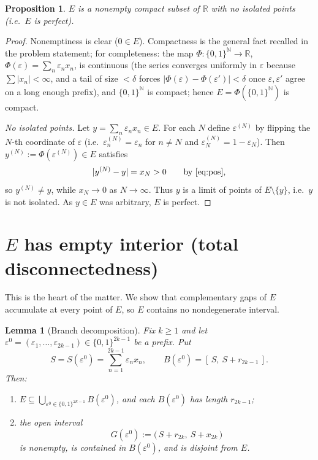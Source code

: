 \documentclass{amsart}
\newtheorem{lemma}{Lemma}
\newtheorem{proposition}{Proposition}
\theoremstyle{definition}
\begin{document}
\begin{proposition}\label{prop:perfect}
$E$ is a nonempty compact subset of $\mathbb R$ with no isolated points (i.e.\ $E$ is perfect).
\end{proposition}

\begin{proof}
Nonemptiness is clear ($0\in E$). Compactness is the general fact recalled in the
problem statement; for completeness: the map
$\Phi\colon\{0,1\}^{\mathbb N}\to\mathbb R$, $\Phi(\varepsilon)=\sum_{n}\varepsilon_n x_n$, is continuous
(the series converges uniformly in $\varepsilon$ because $\sum|x_n|<\infty$, and a tail of size
$<\delta$ forces $|\Phi(\varepsilon)-\Phi(\varepsilon')|<\delta$ once $\varepsilon,\varepsilon'$ agree on a long enough
prefix), and $\{0,1\}^{\mathbb N}$ is compact; hence $E=\Phi(\{0,1\}^{\mathbb N})$ is compact.

\emph{No isolated points.} Let $y=\sum_{n}\varepsilon_n x_n\in E$. For each $N$ define
$\varepsilon^{(N)}$ by flipping the $N$-th coordinate of $\varepsilon$ (i.e.\ $\varepsilon^{(N)}_n=\varepsilon_n$ for
$n\ne N$ and $\varepsilon^{(N)}_N=1-\varepsilon_N$). Then $y^{(N)}:=\Phi(\varepsilon^{(N)})\in E$ satisfies
$$|y^{(N)}-y|=x_N>0\qquad\text{by \eqref{eq:pos},}$$
so $y^{(N)}\ne y$, while $x_N\to 0$ as $N\to\infty$. Thus $y$ is a limit of points of
$E\setminus\{y\}$, i.e.\ $y$ is not isolated. As $y\in E$ was arbitrary, $E$ is perfect.
\end{proof}

\section{$E$ has empty interior (total disconnectedness)}

This is the heart of the matter. We show that complementary gaps of $E$ accumulate at
every point of $E$, so $E$ contains no nondegenerate interval.

\begin{lemma}[Branch decomposition]\label{lem:branch}
Fix $k\ge 1$ and let $\varepsilon^{0}=(\varepsilon_1,\dots,\varepsilon_{2k-1})\in\{0,1\}^{2k-1}$ be a prefix.
Put
$$S=S(\varepsilon^{0})=\sum_{n=1}^{2k-1}\varepsilon_n x_n,\qquad
B(\varepsilon^{0})=[\,S,\ S+r_{2k-1}\,].$$
Then:
\begin{enumerate}
\item[(i)] $E\subseteq\bigcup_{\varepsilon^{0}\in\{0,1\}^{2k-1}}B(\varepsilon^{0})$, and each
$B(\varepsilon^{0})$ has length $r_{2k-1}$;
\item[(ii)] the open interval
$$G(\varepsilon^{0}):=\big(\,S+r_{2k},\ S+x_{2k}\,\big)$$
is nonempty, is contained in $B(\varepsilon^{0})$, and is disjoint from $E$.
\end{enumerate}
\end{lemma}
\end{document}
